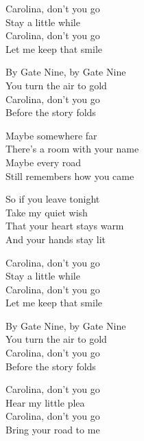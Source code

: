 \begin{lyrics}
Carolina, don’t you go\\
Stay a little while\\
Carolina, don’t you go\\
Let me keep that smile

By Gate Nine, by Gate Nine\\
You turn the air to gold\\
Carolina, don’t you go\\
Before the story folds

Maybe somewhere far\\
There’s a room with your name\\
Maybe every road\\
Still remembers how you came

So if you leave tonight\\
Take my quiet wish\\
That your heart stays warm\\
And your hands stay lit

Carolina, don’t you go\\
Stay a little while\\
Carolina, don’t you go\\
Let me keep that smile

By Gate Nine, by Gate Nine\\
You turn the air to gold\\
Carolina, don’t you go\\
Before the story folds


Carolina, don’t you go\\
Hear my little plea\\
Carolina, don’t you go\\
Bring your road to me
\end{lyrics}

